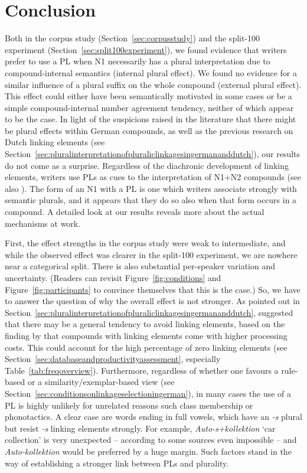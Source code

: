 \section{Conclusion}
\label{sec:conclusion}

Both in the corpus study (Section~\ref{sec:corpusstudy}) and the split-100 experiment (Section~\ref{sec:split100experiment}), we found evidence that writers prefer to use a PL when N1 necessarily has a plural interpretation due to compound-internal semantics (internal plural effect).
We found no evidence for a similar influence of a plural suffix on the whole compound (external plural effect).
This effect could either have been semantically motivated in some cases or be a simple compound-internal number agreement tendency, neither of which appear to be the case.
In light of the suspicions raised in the literature that there might be plural effects within German compounds, as well as the previous research on Dutch linking elements (see Section~\ref{sec:pluralinterpretationofpluraliclinkagesingermananddutch}), our results do not come as a surprise.
Regardless of the diachronic development of linking elements, writers use PLs as cues to the interpretation of N1+N2 compounds (see also \citealt[212]{BangaEa2013b}).
The form of an N1 with a PL is one which writers associate strongly with semantic plurals, and it appears that they do so also when that form occurs in a compound.
A detailed look at our results reveals more about the actual mechanisms at work.

First, the effect strengths in the corpus study were weak to intermediate, and while the observed effect was clearer in the split-100 experiment, we are nowhere near a categorical split.
There is also substantial per-speaker variation and uncertainty.
(Readers can revisit Figure~\ref{fig:conditions} and Figure~\ref{fig:participants} to convince themselves that this is the case.)
So, we have to answer the question of why the overall effect is not stronger.
As pointed out in Section~\ref{sec:pluralinterpretationofpluraliclinkagesingermananddutch}, \textcite[45]{BangaEa2013a} suggested that there may be a general tendency to avoid linking elements, based on the finding by \textcite{LibbenEa2002} that compounds with linking elements come with higher processing costs.
This could account for the high percentage of zero linking elements (see Section~\ref{sec:databaseandproductivityassessment}, especially Table~\ref{tab:freqoverview}).
Furthermore, regardless of whether one favours a rule-based or a similarity\slash exemplar-based view (see Section~\ref{sec:conditionsonlinkageselectioningerman}), in many cases the use of a PL is highly unlikely for unrelated reasons such class membership or phonotactics.
A clear case are words ending in full vowels, which have an \textit{-s} plural but resist \textit{-s} linking elements strongly.
For example, \textit{Auto-s+kollektion} `car collection' is very unexpected -- according to some sources even impossible \citep{Wegener2003,Wegener2005,Fuhrhop1996} -- and \textit{Auto-kollektion} would be preferred by a huge margin.
Such factors stand in the way of establishing a stronger link between PLs and plurality.

